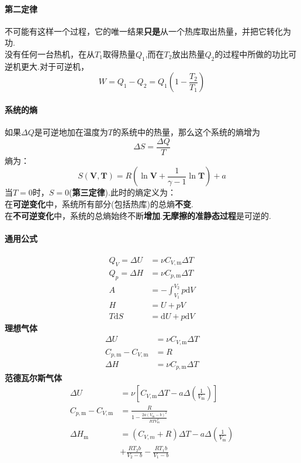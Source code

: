 \documentclass[10pt]{article}
\numberwithin{equation}{section}
\begin{document}
\begin{multicols}{3}
\begin{CJK}{UTF8}{gbsn}
\paragraph{第二定律}  不可能有这样一个过程，它的唯一结果\textbf{只是}从一个热库取出热量，并把它转化为功.\\
没有任何一台热机，在从$T_1$取得热量$Q_1$,而在$T_2$放出热量$Q_2$的过程中所做的功比可逆机更大.对于可逆机，
\begin{equation}
  W=Q_1-Q_2=Q_1\left(1-\frac{T_2}{T_1}\right)
\end{equation}
\paragraph{系统的熵}

如果$\Delta Q$是可逆地加在温度为$T$的系统中的热量，那么这个系统的熵增为
  \begin{equation}
  \Delta S=\frac{\Delta Q}{T}
  \end{equation}
  熵为：
  \begin{equation}
    S(\bm{V},\bm{T})=R\left(\ln \bm{V}+\frac{1}{\gamma-1}\ln \bm{T} \right)+a
  \end{equation}
  当$T=0$时，$S=0$(\textbf{第三定律}).此时的熵定义为：\\
  在\textbf{可逆变化}中，系统所有部分(包括热库)的总熵\textbf{不变}.\\
  在\textbf{不可逆变化}中，系统的总熵始终不断\textbf{增加}.\textbf{无摩擦的准静态过程}是可逆的.

\paragraph{通用公式}
\begin{align}
  Q_V=\Delta U&=\nu C_{V,\textrm{m}}\Delta T\\
  Q_p=\Delta H&=\nu C_{p,\textrm{m}}\Delta T \\
  A&=-\int_{V_1}^{V_2}p\textrm{d}V \\
  H& =U+pV \\
  T\textrm{d}S&=\textrm{d}U+p\textrm{d}V
\end{align}
\textbf{理想气体}
  \begin{align}
  \Delta U&=\nu C_{V,\textrm{m}}\Delta T \\
  C_{p,\textrm{m}}-C_{V,\textrm{m}}&=R \\
  \Delta H &= \nu C_{p,\textrm{m}}\Delta T
  \end{align}
\textbf{范德瓦尔斯气体}
  \begin{align}
  \Delta U&= \nu \left[ C_{V,\textrm{m}}\Delta T-a\Delta \left( \frac{1}{V_{\textrm{m}}} \right) \right]\\
  C_{p,\textrm{m}}-C_{V,\textrm{m}}&=\frac{R}{1-\frac{2a(V_{\textrm{m}}-b)^2}{RTV_{\textrm{m}}^3}}\\
  \Delta H_{\textrm{m}} &= (C_{V,m\textrm{}}+R)\Delta T -a \Delta \left( \frac{1}{V_{\textrm{m}}} \right)\nonumber \\&+\frac{RT_2b}{V_2-b}-\frac{RT_1b}{V_1-b}
  \end{align}


\end{CJK}
\end{multicols}
\end{document}

